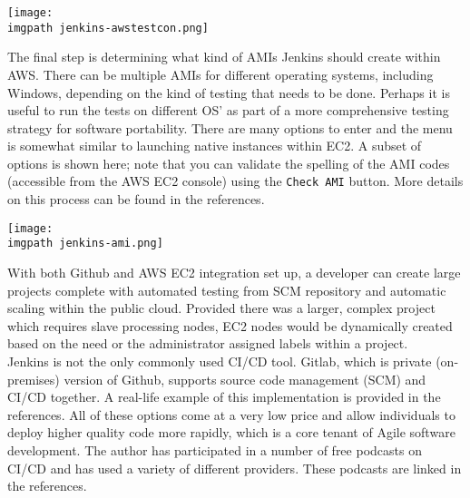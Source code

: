     \begin{minipage}[t]{\linewidth}
	  \centering
      \texttt{[image: \\imgpath jenkins-awstestcon.png]}
    \end{minipage}

The final step is determining what kind of AMIs Jenkins should create within
AWS. There can be multiple AMIs for different operating systems, including
Windows, depending on the kind of testing that needs to be done. Perhaps it is
useful to run the tests on different OS' as part of a more comprehensive
testing strategy for software portability. There are many options to enter and
the menu is somewhat similar to launching native instances within EC2. A
subset of options is shown here; note that you can validate the spelling of
the AMI codes (accessible from the AWS EC2 console) using the \verb|Check AMI|
button. More details on this process can be found in the references.

    \begin{minipage}[t]{\linewidth}
	  \centering
      \texttt{[image: \\imgpath jenkins-ami.png]}
    \end{minipage}

With both Github and AWS EC2 integration set up, a developer can create large
projects complete with automated testing from SCM repository and automatic
scaling within the public cloud. Provided there was a larger, complex project
which requires slave processing nodes, EC2 nodes would be dynamically created
based on the need or the administrator assigned labels within a project. \\

Jenkins is not the only commonly used CI/CD tool. Gitlab, which is private
(on-premises) version of Github, supports source code management (SCM) and
CI/CD together. A real-life example of this implementation is provided in the
references. All of these options come at a very low price and allow
individuals to deploy higher quality code more rapidly, which is a core tenant
of Agile software development. The author has participated in a number of free
podcasts on CI/CD and has used a variety of different providers. These podcasts
are linked in the references.
